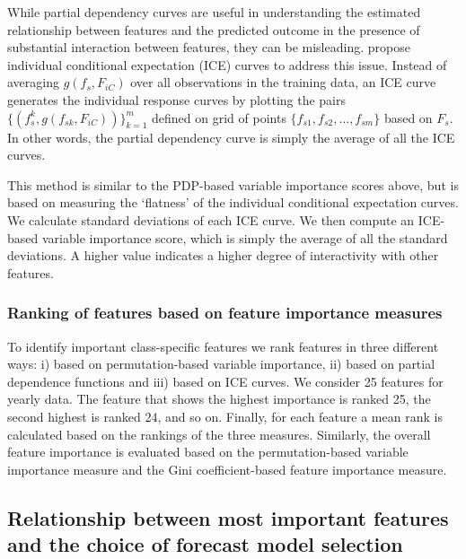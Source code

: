 \documentclass[11pt,a4paper,]{article}
\begin{document}
While partial dependency curves are useful in understanding the estimated relationship between features and the predicted outcome in the presence of substantial interaction between features, they can be misleading. \textcite{goldstein2015peeking} propose individual conditional expectation (ICE) curves to address this issue. Instead of
averaging \(g(f_s, F_{iC})\) over all observations in the training data, an ICE curve generates the individual response curves by plotting the pairs \(\{(f_s^k, g(f_{sk}, F_{iC}))\}_{k=1}^{m}\) defined on grid of points \(\{f_{s1}, f_{s2},\dots, f_{sm}\}\) based on \(F_s\). In other words, the partial dependency curve is simply the average of all the ICE curves.

This method is similar to the PDP-based variable importance scores above, but is based on measuring the `flatness' of the individual conditional expectation curves. We calculate standard deviations of each ICE curve. We then compute an ICE-based variable importance score, which is simply the average of all the standard deviations. A higher value indicates a higher degree of interactivity with other features.

\hypertarget{ranking-of-features-based-on-feature-importance-measures}{%
\subsubsection{Ranking of features based on feature importance measures}\label{ranking-of-features-based-on-feature-importance-measures}}

To identify important class-specific features we rank features in three different ways: i) based on permutation-based variable importance, ii) based on partial dependence functions and iii) based on ICE curves. We consider 25 features for yearly data. The feature that shows the highest importance is ranked 25, the second highest is ranked 24, and so on. Finally, for each feature a mean rank is calculated based on the rankings of the three measures. Similarly, the overall feature importance is evaluated based on the permutation-based variable importance measure and the Gini coefficient-based feature importance measure.

\hypertarget{relationship-between-most-important-features-and-the-choice-of-forecast-model-selection}{%
\subsection{Relationship between most important features and the choice of forecast model selection}\label{relationship-between-most-important-features-and-the-choice-of-forecast-model-selection}}
\end{document}
